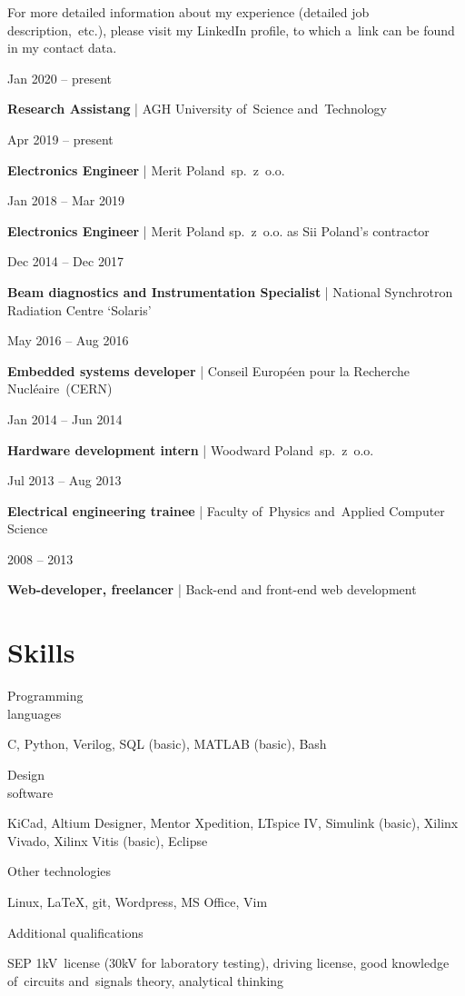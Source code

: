 \documentclass[11pt,a4paper,sans]{article}
\newcommand{\cvexpdateslimitem}[3]{
	
	\noindent
	\begin{minipage}[t]{0.22\linewidth}
		#1
	\end{minipage}
	\hfill
	\begin{minipage}[t]{0.76\linewidth}
		\begin{flushleft}
			{\bfseries #2} | #3
		\end{flushleft}
	\end{minipage}
	\vspace{.5\baselineskip}
	
}
\newcommand{\cvskillsitem}[2]{
	
	\noindent
	\begin{minipage}{0.21\linewidth}
		\begin{flushleft}
			#1
		\end{flushleft}
	\end{minipage}
	\hfill
	\begin{minipage}{0.766\linewidth}
		
		\begin{flushleft}
			#2
		\end{flushleft}
	\end{minipage}
	\vspace{.65\baselineskip}
}
\begin{document}
	For more detailed information about my experience (detailed job
	description,~etc.), please visit my LinkedIn profile, to which a~link can
	be found in my contact data.
	\vspace{1\baselineskip}

	\cvexpdateslimitem
		{Jan 2020 -- present}
		{Research Assistang}
		{AGH University of~Science and~Technology}

	\cvexpdateslimitem
		{Apr 2019 -- present}
		{Electronics Engineer}
		{Merit Poland~sp.~z~o.o.}
		
	\cvexpdateslimitem
		{Jan 2018 -- Mar 2019}
		{Electronics Engineer}
		{Merit Poland sp.~z~o.o. as Sii Poland's contractor}
		
	\cvexpdateslimitem
		{Dec 2014 -- Dec 2017}
		{Beam diagnostics and Instrumentation Specialist}
		{National Synchrotron Radiation Centre `Solaris'}
	
	\cvexpdateslimitem
		{May 2016 -- Aug 2016}
		{Embedded systems developer}
		{Conseil Européen pour la Recherche Nucléaire~(CERN)}
	
	\cvexpdateslimitem
		{Jan 2014 -- Jun 2014}
		{Hardware development intern}
		{Woodward Poland~sp.~z~o.o.}
	
	\cvexpdateslimitem
		{Jul 2013 -- Aug 2013}
		{Electrical engineering trainee}
		{Faculty of~Physics	and~Applied Computer Science}
	
	\cvexpdateslimitem
		{2008 -- 2013}
		{Web-developer, freelancer}
		{Back-end and front-end web development}
	
	\section{Skills}
	\cvskillsitem
	{Programming\\languages}
	{C, Python, Verilog, SQL (basic), MATLAB (basic),
	Bash}
	
	\cvskillsitem
	{Design\\software}
	{KiCad, Altium Designer, Mentor Xpedition, LTspice IV, Simulink (basic), Xilinx
	Vivado, Xilinx Vitis (basic), Eclipse}
	
	\cvskillsitem
	{Other technologies}
	{Linux, \LaTeX, git, Wordpress, MS Office, Vim}
	
	\cvskillsitem
	{Additional qualifications}
	{SEP 1\hspace{3pt}kV~license (30\hspace{3pt}kV for laboratory testing), 
	driving license, good knowledge of~circuits and~signals theory, 
	analytical thinking}
	
\end{document}
